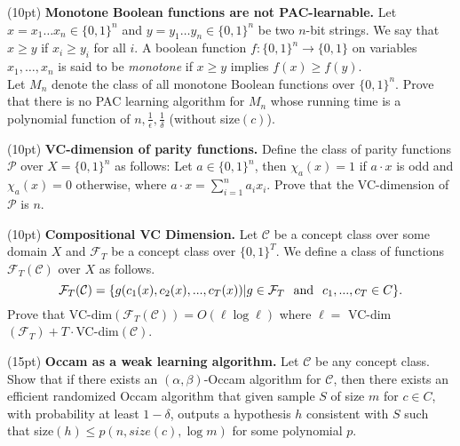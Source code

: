 \documentclass[11pt]{article}
\DeclareMathOperator{\1}{\mathbbm{1}}
\begin{document}
\begin{problem} (10pt) \textbf{Monotone Boolean functions are not PAC-learnable.} Let $x = x_1\dots x_n \in \{0,1\}^n$ and $y = y_1\dots y_n \in
\{0,1\}^n$ be two $n$-bit strings.  We say that $x \geq y$ if $x_i \geq y_i$ for
all $i.$ A boolean function $f: \{0,1\}^n \rightarrow \{0,1\}$ on variables
$x_1,\dots,x_n$ is said to be {\em monotone} if $x \geq y$ implies $f(x) \geq
f(y).$\\ Let $M_n$ denote the class of all monotone Boolean functions over
$\{0,1\}^n.$  Prove that there is no PAC learning algorithm for $M_n$ whose
running time is a polynomial function of $n, \frac{1}{\epsilon}, \frac{1}{\delta}$ (without
size$(c)$).
\end{problem}





\begin{problem} (10pt) \textbf{VC-dimension of parity functions.}
Define the class of parity functions ${\mathcal P}$ over $X = \{0, 1\}^n$ as
follows: Let $a \in \{0, 1\}^n$, then $\chi_a(x) = 1$ if $a \cdot x$ is odd and
$\chi_a(x) = 0$ otherwise, where $a \cdot x = \sum_{i=1}^n a_i x_i$. Prove that the VC-dimension of ${\mathcal P}$ is $n$. 

\end{problem}



\begin{problem} (10pt) \textbf{Compositional VC Dimension.}
Let $\mathcal{C}$ be a concept class over some domain $X$ and $\mathcal{F}_T$ be a concept class over $\{0, 1\}^T$. We define a class of functions $\mathcal{F}_T(\mathcal{C})$ over $X$ as follows. 
\[\mathcal{F}_T(\mathcal{C}) = \{g(c_1(x), c_2(x), . . . , c_T(x)) | g \in \mathcal{F}_T \hspace{0.25cm} \text{\rm and} \hspace{0.25cm} c_1, . . . , c_T \in C\}.\] 
Prove that VC-dim$(\mathcal{F}_T(\mathcal{C})) = O(\ell \log \ell)$ where $\ell =$ VC-dim$(\mathcal{F}_T) + T \cdot $VC-dim$(\mathcal{C})$. 
\end{problem}




\begin{problem}(15pt) \textbf{Occam as a weak learning algorithm.} Let $\mathcal{C}$ be any concept class. Show that if there exists an $(\alpha, \beta)$-Occam algorithm for $\mathcal{C}$, then there exists an efficient randomized Occam algorithm that given sample $S$ of size $m$ for $c \in C$, with probability at least $1 - \delta$, outputs a hypothesis $h$ consistent with $S$ such that size$(h) \leq p(n,size(c), \log m)$ for some polynomial $p$.
\end{problem}
\end{document}
